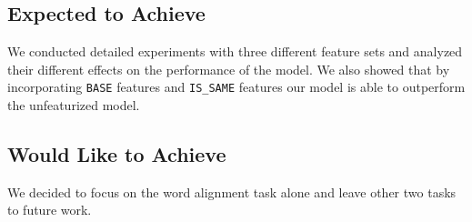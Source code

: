 \documentclass[11pt,letterpaper]{article}
\begin{document}
\subsection{Expected to Achieve}
We conducted detailed experiments with three different feature sets and analyzed their different effects on the performance of the model. We also showed that by incorporating \texttt{BASE} features and \texttt{IS\_SAME} features our model is able to outperform the unfeaturized model.

\subsection{Would Like to Achieve}
We decided to focus on the word alignment task alone and leave other two tasks to future work.



\end{document}
